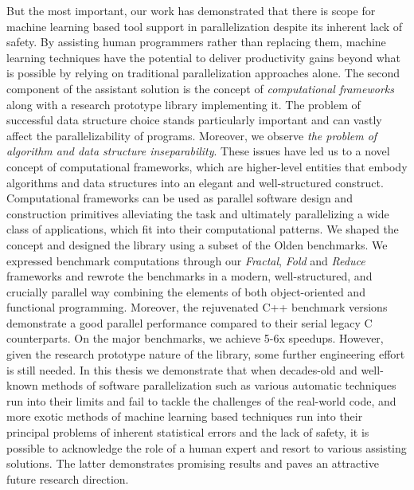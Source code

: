 \quad But the most important, our work has demonstrated that there is scope for machine learning based tool support in parallelization despite its inherent lack of safety. By assisting human programmers rather than replacing them, machine learning techniques have the potential to deliver productivity gains beyond what is possible by relying on traditional parallelization approaches alone.\newline\null
\quad The second component of the assistant solution is the concept of \textit{computational frameworks} along with a research prototype library implementing it. The problem of successful data structure choice stands particularly important and can vastly affect the parallelizability of programs. Moreover, we observe \textit{the problem of algorithm and data structure inseparability}. These issues have led us to a novel concept of computational frameworks, which are higher-level entities that embody algorithms and data structures into an elegant and well-structured construct. Computational frameworks can be used as parallel software design and construction primitives alleviating the task and ultimately parallelizing a wide class of applications, which fit into their computational patterns.\newline\null
\quad We shaped the concept and designed the library using a subset of the Olden benchmarks. We expressed benchmark computations through our \textit{Fractal}, \textit{Fold} and \textit{Reduce} frameworks and rewrote the benchmarks in a modern, well-structured, and crucially parallel way combining the elements of both object-oriented and functional programming. Moreover, the rejuvenated C++ benchmark versions demonstrate a good parallel performance compared to their serial legacy C counterparts. On the major benchmarks, we achieve 5-6x speedups. However, given the research prototype nature of the library, some further engineering effort is still needed.\newline\null
\quad In this thesis we demonstrate that when decades-old and well-known methods of software parallelization such as various automatic techniques run into their limits and fail to tackle the challenges of the real-world code, and more exotic methods of machine learning based techniques run into their principal problems of inherent statistical errors and the lack of safety, it is possible to acknowledge the role of a human expert and resort to various assisting solutions. The latter demonstrates promising results and paves an attractive future research direction.

%